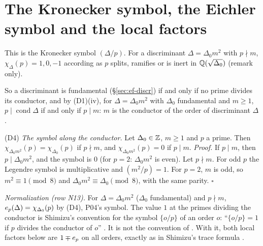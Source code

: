 \section{The Kronecker symbol, the Eichler symbol and the local factors}\label{sec:ef-local}

\begin{definition}
\end{definition}
\noindent This is the Kronecker symbol $(\Delta/p)$. For a discriminant $\Delta=\Delta_0m^2$ with $p\nmid m$, $\chi_\Delta(p)=1,0,-1$ according as $p$
splits, ramifies or is inert in $\mathbb{Q}(\sqrt{\Delta_0})$ (remark only).

\begin{definition}
\end{definition}
\noindent So a discriminant is fundamental (§\ref{sec:ef-discr}) if and only if no prime divides its conductor, and by (D1)(iv), for
$\Delta=\Delta_0m^2$ with $\Delta_0$ fundamental and $m\ge1$, $p\mid\operatorname{cond}\Delta$ if and only if $p\mid m$: $m$ is the conductor of
the order of discriminant $\Delta$.

\label{fact:ef-D4}(D4) \emph{The symbol along the conductor.} Let $\Delta_0\in\mathbb{Z}$, $m\ge1$ and $p$ a prime. Then
$\chi_{\Delta_0m^2}(p)=\chi_{\Delta_0}(p)$ if $p\nmid m$, and $\chi_{\Delta_0m^2}(p)=0$ if $p\mid m$. \emph{Proof.} If $p\mid m$, then $p\mid\Delta_0m^2$,
and the symbol is $0$ (for $p=2$: $\Delta_0m^2$ is even). Let $p\nmid m$. For odd $p$ the Legendre symbol is multiplicative and $(m^2/p)=1$. For
$p=2$, $m$ is odd, so $m^2\equiv1\pmod8$ and $\Delta_0m^2\equiv\Delta_0\pmod8$, with the same parity. $\square$

\begin{definition}
\end{definition}
\noindent \emph{Normalization (row N13).} For $\Delta=\Delta_0m^2$ ($\Delta_0$ fundamental) and $p\nmid m$, $e_p(\Delta)=\chi_{\Delta_0}(p)$ by (D4),
P04's symbol. The value $1$ at the primes dividing the conductor is Shimizu's convention for the symbol $\{o/p\}$ of an order $o$: ``$\{o/p\}=1$ if $p$
divides the conductor of $o$'' \cite[p.~178, after (14)]{Shz}. It is not the convention of \cite{Voi}. With it, both local factors below are $1\mp e_p$
on all orders, exactly as in Shimizu's trace formula \cite[Prop.~3.1, pp.~181--182]{Shz}.

